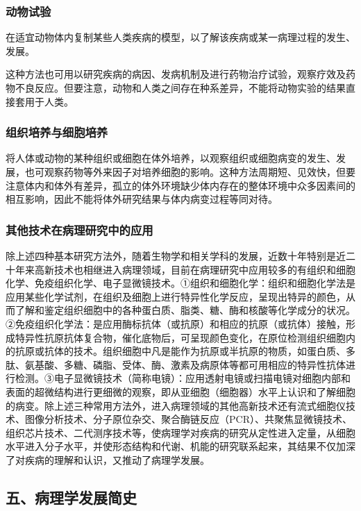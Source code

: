 \subsubsection*{动物试验}

在适宜动物体内复制某些人类疾病的模型，以了解该疾病或某一病理过程的发生、发展。

这种方法也可用以研究疾病的病因、发病机制及进行药物治疗试验，观察疗效及药物不良反应。但要注意，动物和人类之间存在种系差异，不能将动物实验的结果直接套用于人类。

\subsubsection*{组织培养与细胞培养}

将人体或动物的某种组织或细胞在体外培养，以观察组织或细胞病变的发生、发展，也可观察药物等外来因子对培养细胞的影响。这种方法周期短、见效快，但要注意体内和体外有差异，孤立的体外环境缺少体内存在的整体环境中众多因素间的相互影响，因此不能将体外研究结果与体内病变过程等同对待。

\subsubsection*{其他技术在病理研究中的应用}

除上述四种基本研究方法外，随着生物学和相关学科的发展，近数十年特别是近二十年来高新技术也相继进入病理领域，目前在病理研究中应用较多的有组织和细胞化学、免疫组织化学、电子显微镜技术。①组织和细胞化学：组织和细胞化学法是应用某些化学试剂，在组织及细胞上进行特异性化学反应，呈现出特异的颜色，从而了解和鉴定组织细胞中的各种蛋白质、脂类、糖、酶和核酸等化学成分的状况。②免疫组织化学法：是应用酶标抗体（或抗原）和相应的抗原（或抗体）接触，形成特异性抗原抗体复合物，催化底物后，可呈现颜色变化，在原位检测组织细胞内的抗原或抗体的技术。组织细胞中凡是能作为抗原或半抗原的物质，如蛋白质、多肽、氨基酸、多糖、磷脂、受体、酶、激素及病原体等都可用相应的特异性抗体进行检测。③电子显微镜技术（简称电镜）：应用透射电镜或扫描电镜对细胞内部和表面的超微结构进行更细微的观察，即从亚细胞（细胞器）水平上认识和了解细胞的病变。除上述三种常用方法外，进入病理领域的其他高新技术还有流式细胞仪技术、图像分析技术、分子原位杂交、聚合酶链反应（PCR）、共聚焦显微镜技术、组织芯片技术、二代测序技术等，使病理学对疾病的研究从定性进入定量，从细胞水平进入分子水平，并使形态结构和代谢、机能的研究联系起来，其结果不仅加深了对疾病的理解和认识，又推动了病理学发展。

\subsection*{五、病理学发展简史}

